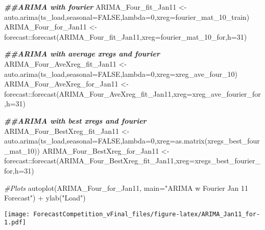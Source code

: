 \documentclass[
]{article}
\newenvironment{Shaded}{\begin{snugshade}}{\end{snugshade}}
\newcommand{\AttributeTok}[1]{\textcolor[rgb]{0.77,0.63,0.00}{#1}}
\newcommand{\CommentTok}[1]{\textcolor[rgb]{0.56,0.35,0.01}{\textit{#1}}}
\newcommand{\ConstantTok}[1]{\textcolor[rgb]{0.00,0.00,0.00}{#1}}
\newcommand{\DecValTok}[1]{\textcolor[rgb]{0.00,0.00,0.81}{#1}}
\newcommand{\DocumentationTok}[1]{\textcolor[rgb]{0.56,0.35,0.01}{\textbf{\textit{#1}}}}
\newcommand{\FunctionTok}[1]{\textcolor[rgb]{0.00,0.00,0.00}{#1}}
\newcommand{\NormalTok}[1]{#1}
\newcommand{\OtherTok}[1]{\textcolor[rgb]{0.56,0.35,0.01}{#1}}
\newcommand{\SpecialCharTok}[1]{\textcolor[rgb]{0.00,0.00,0.00}{#1}}
\newcommand{\StringTok}[1]{\textcolor[rgb]{0.31,0.60,0.02}{#1}}
\begin{document}
\begin{Shaded}
\begin{Highlighting}[]
\DocumentationTok{\#\#ARIMA with fourier}
\NormalTok{ARIMA\_Four\_fit\_Jan11 }\OtherTok{\textless{}{-}} \FunctionTok{auto.arima}\NormalTok{(ts\_load,}\AttributeTok{seasonal=}\ConstantTok{FALSE}\NormalTok{,}\AttributeTok{lambda=}\DecValTok{0}\NormalTok{,}\AttributeTok{xreg=}\NormalTok{fourier\_mat\_10\_train)}
\NormalTok{ARIMA\_Four\_for\_Jan11 }\OtherTok{\textless{}{-}}\NormalTok{ forecast}\SpecialCharTok{::}\FunctionTok{forecast}\NormalTok{(ARIMA\_Four\_fit\_Jan11,}\AttributeTok{xreg=}\NormalTok{fourier\_mat\_10\_for,}\AttributeTok{h=}\DecValTok{31}\NormalTok{) }

\DocumentationTok{\#\#ARIMA with average xregs and fourier}
\NormalTok{ARIMA\_Four\_AveXreg\_fit\_Jan11 }\OtherTok{\textless{}{-}} \FunctionTok{auto.arima}\NormalTok{(ts\_load,}\AttributeTok{seasonal=}\ConstantTok{FALSE}\NormalTok{,}\AttributeTok{lambda=}\DecValTok{0}\NormalTok{,}\AttributeTok{xreg=}\NormalTok{xreg\_ave\_four\_10)}
\NormalTok{ARIMA\_Four\_AveXreg\_for\_Jan11 }\OtherTok{\textless{}{-}}\NormalTok{ forecast}\SpecialCharTok{::}\FunctionTok{forecast}\NormalTok{(ARIMA\_Four\_AveXreg\_fit\_Jan11,}\AttributeTok{xreg=}\NormalTok{xreg\_ave\_fourier\_for,}\AttributeTok{h=}\DecValTok{31}\NormalTok{) }

\DocumentationTok{\#\#ARIMA with best xregs and fourier}
\NormalTok{ARIMA\_Four\_BestXreg\_fit\_Jan11 }\OtherTok{\textless{}{-}} \FunctionTok{auto.arima}\NormalTok{(ts\_load,}\AttributeTok{seasonal=}\ConstantTok{FALSE}\NormalTok{,}\AttributeTok{lambda=}\DecValTok{0}\NormalTok{,}\AttributeTok{xreg=}\FunctionTok{as.matrix}\NormalTok{(xregs\_best\_four\_mat\_10))}
\NormalTok{ARIMA\_Four\_BestXreg\_for\_Jan11 }\OtherTok{\textless{}{-}}\NormalTok{ forecast}\SpecialCharTok{::}\FunctionTok{forecast}\NormalTok{(ARIMA\_Four\_BestXreg\_fit\_Jan11,}\AttributeTok{xreg=}\NormalTok{xregs\_best\_fourier\_for,}\AttributeTok{h=}\DecValTok{31}\NormalTok{) }

\CommentTok{\#Plots}
\FunctionTok{autoplot}\NormalTok{(ARIMA\_Four\_for\_Jan11, }\AttributeTok{main=}\StringTok{"ARIMA w Fourier Jan \textquotesingle{}11 Forecast"}\NormalTok{) }\SpecialCharTok{+} \FunctionTok{ylab}\NormalTok{(}\StringTok{"Load"}\NormalTok{)}
\end{Highlighting}
\end{Shaded}

\texttt{[image: ForecastCompetition\_vFinal\_files/figure-latex/ARIMA\_Jan11\_for-1.pdf]}
\end{document}
